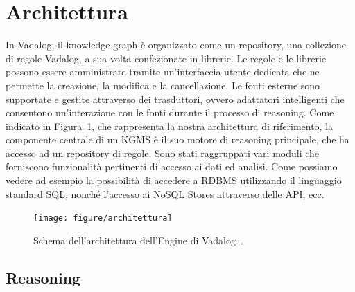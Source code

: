 \section{Architettura}

In Vadalog, il knowledge graph è organizzato come un repository, una collezione di regole Vadalog, a sua volta confezionate in librerie. \newline
Le regole e le librerie possono essere amministrate tramite un'interfaccia utente dedicata che ne permette la creazione, la modifica e la cancellazione. \newline
Le fonti esterne sono supportate e gestite attraverso dei trasduttori, ovvero adattatori intelligenti che consentono un'interazione con le fonti durante il processo di reasoning. \newline
Come indicato in Figura~\ref{fig:architettura}, che rappresenta la nostra architettura di riferimento, la componente centrale di un KGMS è il suo motore di reasoning principale, che ha accesso ad un repository di regole. Sono stati raggruppati vari moduli che forniscono funzionalità pertinenti di accesso ai dati ed analisi. Come possiamo vedere ad esempio la possibilità di accedere a RDBMS utilizzando il linguaggio standard SQL, nonché l'accesso ai NoSQL Stores attraverso delle API, ecc.

\begin{figure}[h!]
	\centering
	\texttt{[image: figure/architettura]}
	\caption{Schema dell'architettura dell'Engine di Vadalog~\cite{bellomarini2017swift}.}
	\label{fig:architettura}
\end{figure}

\subsection{Reasoning}


